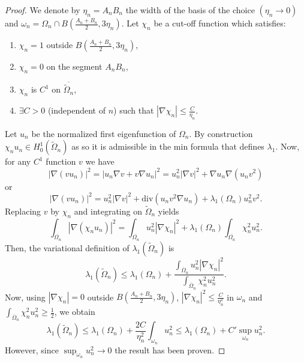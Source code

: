 \begin{proof}
  We denote by $\eta_{n} = A_{n}B_{n}$ the width of the basis of the choice $(\eta_{n} \to 0)$ and $\omega_{n} = \Omega_{n} \cap B(\frac{A_{n} + B_{n}}{2}, 3\eta_{n})$.
  Let $\chi_{n}$ be a cut-off function which satisfies:
  \begin{enumerate}
    \item $\chi_{n} = 1$ outside $B(\frac{A_{n} + B_{n}}{2}, 3\eta_{n})$,
    \item $\chi_{n} = 0$ on the segment $A_{n}B_{n}$,
    \item $\chi_{n}$ is $C^{1}$ on $\overline{\widetilde{\Omega}_{n}}$,
    \item $\exists C > 0$ (independent of $n$) such that $| \nabla \chi_{n} | \leq \frac{C}{\eta_{n}}$.
  \end{enumerate}
  Let $u_{n}$ be the normalized first eigenfunction of $\Omega_{n}$.
  By construction $\chi_{n}u_{n} \in H_{0}^{1}(\widetilde{\Omega}_{n})$ as so it is admissible in the min formula that defines $\lambda_{1}$.
  Now, for any $C^{1}$ function $v$ we have
  \[
  | \nabla(v u_{n}) |^{2} = | u_{n} \nabla v + v \nabla u_{n}  |^{2} = u_{n}^{2} | \nabla v |^{2} + \nabla u_{n} \nabla (u_{n}v^{2})
  \] 
  or 
  \[
    | \nabla(v u_{n}) |^{2} = u_{n}^{2} | \nabla v |^2 + \text{div} (u_{n} v^2 \nabla u_{n}) + \lambda_{1}(\Omega_{n})u_{n}^2 v^2
  .\] 
  Replacing $v$ by $\chi_{n}$ and integrating on $\widetilde{\Omega}_{n}$ yields
  \[
    \int_{ \overline{\Omega_{n}}} \! | \nabla (\chi_{n}u_{n}) |^2 = \int_{ \overline{\Omega_{n}}} \! u_{n}^{2}| \nabla \chi_{n} |^2 + \lambda_{1}(\Omega_{n}) \int_{ \overline{\Omega_{n}}} \! \chi_{n}^2 u_{n}^2  
  .\] 
  Then, the variational definition of $\lambda_{1}(\widetilde{\Omega}_{n})$ is
  \[
  \lambda_{1}(\widetilde{\Omega}_{n}) \leq \lambda_{1}(\Omega_{n}) + \frac{\int_{ \overline{\Omega}_{n}} \! u_{n}^2 | \nabla \chi_{n} |^2 }{\int_{ \overline{\Omega}_{n}} \! \chi_{n}^2 u_{n}^2 }
  .\] 
  Now, using $| \nabla \chi_{n} | = 0$ outside $B(\frac{A_{n} + B_{n}}{2}, 3\eta_{n})$, $| \nabla \chi_{n} |^2 \leq \frac{C}{\eta_{n}^{2}}$ in $\omega_{n}$ and $\int_{ \overline{\Omega}_{n}} \! \chi_{n}^{2}u_{n}^{2} \geq \frac{1}{2} $, we obtain
  \[
  \lambda_{1}(\widetilde{\Omega}_{n}) \leq \lambda_{1}(\Omega_{n}) + \frac{2C}{\eta_{n}^{2}} \int_{ \omega_{n}} \! u_{n}^{2} \leq \lambda_{1}(\Omega_{n}) + C' \sup_{\omega_{n}} u_{n}^{2} 
  .\] 
  However, since $\sup_{\omega_{n}} u_{n}^{2} \to 0$ the result has been proven.


\end{proof}
